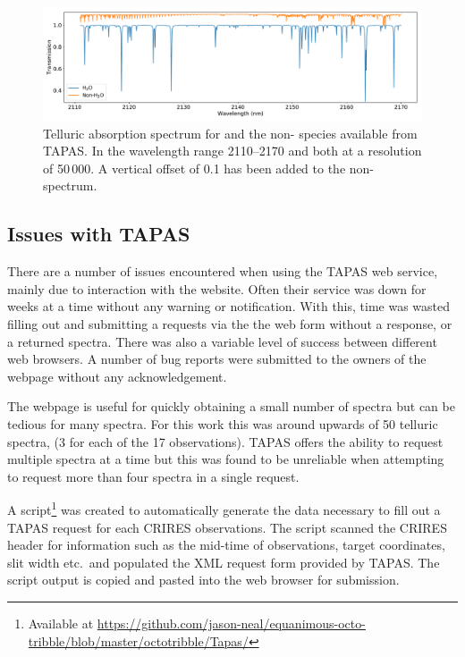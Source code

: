\begin{figure}
    \centering
    \includegraphics[width=0.8\linewidth]{figures/atmos_and_models/telluric_components}
    \caption[Telluric spectra for the  and non- species.]{Telluric absorption spectrum for  and the non- species available from {TAPAS}.
        In the wavelength range 2110--2170\nm{} and both at a resolution of 50\,000.
        A vertical offset of 0.1 has been added to the non- spectrum.}
    \label{fig:telluriccomponents}
\end{figure}


\subsection{Issues with {TAPAS}}
There are a number of issues encountered when using the {TAPAS} web service, mainly due to interaction with the website.
Often their service was down for weeks at a time without any warning or notification.
With this, time was wasted filling out and submitting a requests via the the web form without a response, or a returned spectra.
There was also a variable level of success between different web browsers.
A number of bug reports were submitted to the owners of the webpage without any acknowledgement.

The webpage is useful for quickly obtaining a small number of spectra but can be tedious for many spectra.
For this work this was around upwards of 50 telluric spectra, (3 for each of the 17 observations).
{TAPAS} offers the ability to request multiple spectra at a time but this was found to be unreliable when attempting to request more than four spectra in a single request.

A script\footnote{Available at \href{https://github.com/jason-neal/equanimous-octo-tribble/blob/master/octotribble/Tapas/}{https://github.com/jason-neal/equanimous-octo-tribble/blob/master/octotribble/Tapas/}} was created to automatically generate the data necessary to fill out a {TAPAS} request for each {CRIRES} observations.
The script scanned the {CRIRES} header for information such as the mid-time of observations, target coordinates, slit width etc.\ and populated the {XML} request form provided by {TAPAS}.
The script output is copied and pasted into the web browser for submission.

